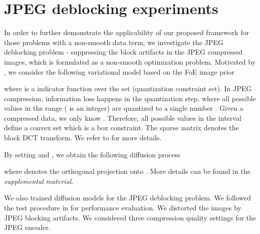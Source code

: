 \documentclass[10pt,journal,compsoc]{IEEEtran}
\begin{document}
\section{JPEG deblocking experiments}\label{JPEG}
In order to further demonstrate the applicability of our proposed framework for those problems with a non-smooth data term, 
we investigate the JPEG deblocking problem - suppressing the block artifacts in the JPEG compressed images, which is 
formulated as a non-smooth optimization problem. 
Motivated by \cite{BrediesH12}, we consider the following variational model based on the FoE image prior 

where  is a indicator function over the set  (quantization constraint set). In JPEG compression, information loss 
happens in the quantization step, where all possible values in the range  ( is an integer) are quantized to a 
single number . Given a compressed data, we only know . Therefore, all possible values in the interval  
define a convex set  which is a box constraint. The sparse matrix 
 denotes the block DCT transform. We refer to \cite{BrediesH12} for more details. 

By setting  and , we obtain the following 
diffusion process

where  denotes the orthogonal projection onto . More details can be found in the 
\textit{supplemental material}. 

We also trained diffusion models for the JPEG deblocking problem. 
We followed the test procedure in \cite{ECCV2012RTF} for performance evaluation. 
We distorted the images by JPEG blocking artifacts. We considered 
three compression quality settings  for the JPEG encoder. 
\end{document}
